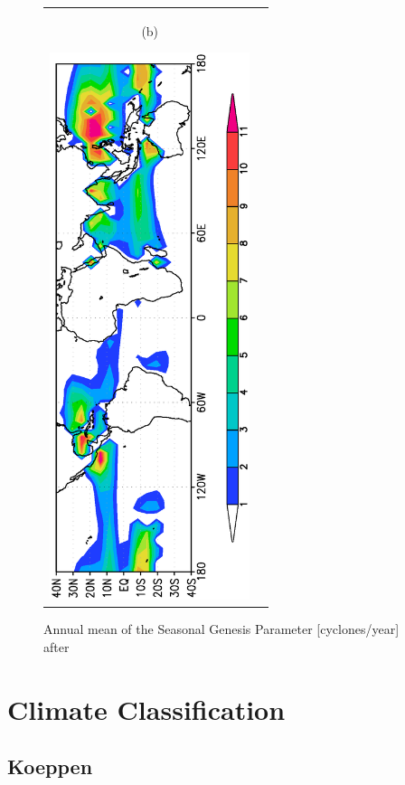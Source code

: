 \documentclass[12pt,a4paper,twoside,openright,headinclude,liststotoc,bibtotoc]{scrreprt}
\begin{document}
\begin{figure}[b]
\begin{tabular}{cc}
\begin{minipage}{1.0\textwidth}
\begin{center}
\begin{scriptsize}(b)\end{scriptsize}\hspace{-1.28cm}\includegraphics[height=16.0cm,angle=-90]{eps/ERAsgpanm.eps}
\end{center}
\end{minipage}
\end{tabular}
\vspace{-1.2cm}\caption[Annual mean Seasonal Genesis Parameter]{Annual mean of the Seasonal Genesis Parameter [cyclones/year] after \citet{Gray1975}}
\label{img:sgp}
\end{figure}


\newpage

\vspace{-0.4cm}
\chapter{Climate Classification}\label{classi}
\vspace{-0.4cm}
\section{Koeppen}
\vspace{-0.4cm}
\end{document}
